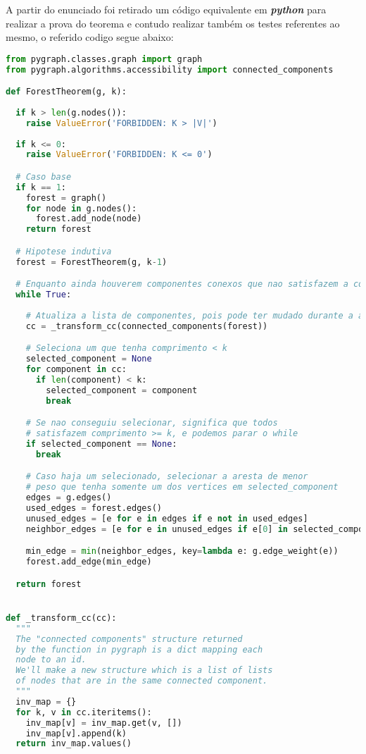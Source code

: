 \documentclass[paper=a4, fontsize=11pt]{scrartcl} %
\numberwithin{equation}{section} %
\numberwithin{figure}{section} %
\numberwithin{table}{section} %
\begin{document}
A partir do enunciado foi retirado um código equivalente em \emph{\textbf{python}} para realizar a prova do teorema e contudo realizar também os testes referentes ao mesmo, o referido codigo segue abaixo:

\begin{lstlisting}[language=Python, caption=Python algorithm]
from pygraph.classes.graph import graph
from pygraph.algorithms.accessibility import connected_components

def ForestTheorem(g, k):
  
  if k > len(g.nodes()):
    raise ValueError('FORBIDDEN: K > |V|')
  
  if k <= 0:
    raise ValueError('FORBIDDEN: K <= 0')

  # Caso base
  if k == 1:
    forest = graph()
    for node in g.nodes():
      forest.add_node(node)
    return forest

  # Hipotese indutiva
  forest = ForestTheorem(g, k-1)

  # Enquanto ainda houverem componentes conexos que nao satisfazem a condicao
  while True:
    
    # Atualiza a lista de componentes, pois pode ter mudado durante a adicao
    cc = _transform_cc(connected_components(forest))

    # Seleciona um que tenha comprimento < k
    selected_component = None
    for component in cc:
      if len(component) < k:
        selected_component = component
        break

    # Se nao conseguiu selecionar, significa que todos 
    # satisfazem comprimento >= k, e podemos parar o while
    if selected_component == None:
      break

    # Caso haja um selecionado, selecionar a aresta de menor
    # peso que tenha somente um dos vertices em selected_component
    edges = g.edges()
    used_edges = forest.edges()
    unused_edges = [e for e in edges if e not in used_edges]
    neighbor_edges = [e for e in unused_edges if e[0] in selected_component]

    min_edge = min(neighbor_edges, key=lambda e: g.edge_weight(e))
    forest.add_edge(min_edge)

  return forest


def _transform_cc(cc):
  """
  The "connected components" structure returned
  by the function in pygraph is a dict mapping each
  node to an id.
  We'll make a new structure which is a list of lists
  of nodes that are in the same connected component.
  """
  inv_map = {}
  for k, v in cc.iteritems():
    inv_map[v] = inv_map.get(v, [])
    inv_map[v].append(k)
  return inv_map.values()
\end{lstlisting}
\end{document}
